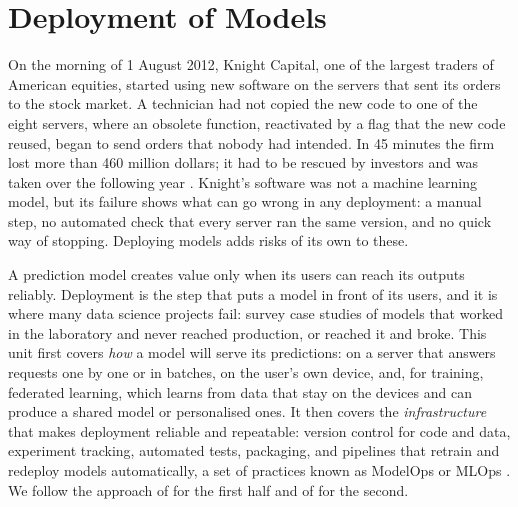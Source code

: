 \chapter{Deployment of Models}\label{ch:deployment}

On the morning of 1 August 2012, Knight Capital, one of the largest traders of American equities, started using new
software on the servers that sent its orders to the stock market. A technician had not copied the new code to one of
the eight servers, where an obsolete function, reactivated by a flag that the new code reused, began to send orders
that nobody had intended. In 45 minutes the firm lost more than 460 million dollars; it had to be rescued by investors
and was taken over the following year \citep{sec2013knight}. Knight's software was not a machine learning model, but
its failure shows what can go wrong in any deployment: a manual step, no automated check that every server ran the same
version, and no quick way of stopping. Deploying models adds risks of its own to these.

A prediction model creates value only when its users can reach its outputs reliably. Deployment is the step that puts a model in front
of its users, and it is where many data science projects fail: \citet{paleyes2022challenges} survey case studies of
models that worked in the laboratory and never reached production, or reached it and broke. This unit first covers \emph{how} a model will serve its predictions: on a server that answers requests one by
one or in batches, on the user's own device, and, for training, federated learning, which learns
from data that stay on the devices and can produce a shared model or personalised ones. It then covers the \emph{infrastructure} that makes deployment
reliable and repeatable: version control for code and data, experiment tracking, automated tests,
packaging, and pipelines that retrain and redeploy models automatically, a set of practices known
as ModelOps or MLOps \citep{kreuzberger2023mlops}. We follow the approach of
\citet{ameisen2020building} for the first half and of \citet{dubovikov2019managing} for the
second.

